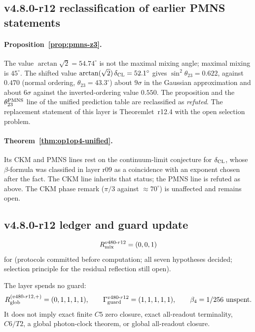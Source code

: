 \subsection*{v4.8.0-r12 reclassification of earlier PMNS statements}
\label{subsec:v480-r12-reclassification}

\paragraph{Proposition~\ref{prop:pmns-z3}.}
The value \(\arctan\sqrt2=54.74^\circ\) is not the maximal mixing angle; maximal mixing is \(45^\circ\).
The shifted value \(\arctan(\sqrt2)\,\delta_{\rm CL}=52.1^\circ\) gives \(\sin^2\theta_{23}=0.622\), against
\(0.470\) (normal ordering, \(\theta_{23}=43.3^\circ\)) about \(9\sigma\) in the Gaussian approximation and
about \(6\sigma\) against the inverted-ordering value \(0.550\).  The proposition and the
\(\theta_{23}^{\rm PMNS}\) line of the unified prediction table are reclassified as \emph{refuted}.  The
replacement statement of this layer is Theoremlet~r12.4 with the open selection problem.

\paragraph{Theorem~\ref{thm:op1op4-unified}.}
Its CKM and PMNS lines rest on the continuum-limit conjecture for \(\delta_{\rm CL}\), whose \(\beta\)-formula
was classified in layer r09 as a coincidence with an exponent chosen after the fact.  The CKM line inherits
that status; the PMNS line is refuted as above.  The CKM phase remark (\(\pi/3\) against \(\approx70^\circ\))
is unaffected and remains open.

\subsection*{v4.8.0-r12 ledger and guard update}
\label{subsec:v480-r12-ledger-guard}

\[
R_{\rm mix}^{v480\text{-}r12}=(0,0,1)
\]
for (protocols committed before computation; all seven hypotheses decided; selection principle for the
residual reflection still open).

The layer spends no guard:
\[
R_{\rm glob}^{(v480\text{-}r12,+)}=(0,1,1,1,1),
\qquad
\Gamma_{\rm guard}^{v480\text{-}r12}=(1,1,1,1,1),
\qquad
\beta_4=1/256\ \text{unspent}.
\]
It does not imply exact finite \(C5\) zero closure, exact all-readout terminality,
\(C6/T2\), a global photon-clock theorem, or global all-readout closure.

